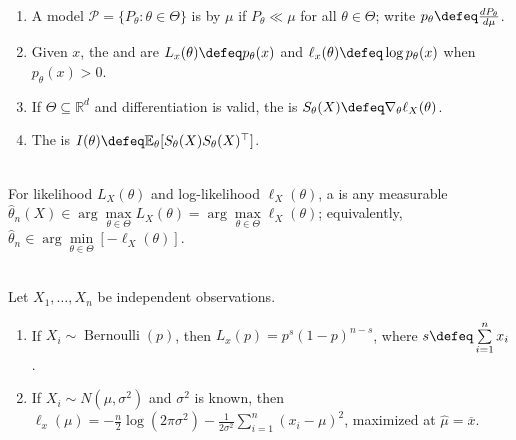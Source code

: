 \begin{definition} \label{def:dominated-model-likelihood-score-information} 
\begin{enumerate}[label=(\roman*)]
\setlength{\itemsep}{0pt}
\item A model $\mathcal{P}=\{P_\theta:\theta\in\Theta\}$ is  by $\mu$ if $P_\theta\ll\mu$ for all $\theta\in\Theta$; write $p_\theta\defeq \frac{dP_\theta}{d\mu}$.
\item Given $x$, the  and  are $L_x(\theta)\defeq p_\theta(x)$ and $\ell_x(\theta)\defeq\log p_\theta(x)$ when $p_\theta(x)>0$.
\item If $\Theta\subseteq\mathbb{R}^d$ and differentiation is valid, the  is $S_\theta(X)\defeq\nabla_\theta\ell_X(\theta)$.
\item The  is $I(\theta)\defeq\mathbb{E}_\theta[S_\theta(X)S_\theta(X)^\top]$.
\end{enumerate}
\end{definition}

\begin{definition} \label{def:maximum-likelihood-estimator} \\
For likelihood $L_X(\theta)$ and log-likelihood $\ell_X(\theta)$, a  is any measurable\\
$\widehat{\theta}_n(X)\in\arg\max\limits_{\theta\in\Theta}L_X(\theta)=\arg\max\limits_{\theta\in\Theta}\ell_X(\theta)$; equivalently, $\widehat{\theta}_n\in\arg\min\limits_{\theta\in\Theta}[-\ell_X(\theta)]$.
\end{definition}

\begin{example} \label{ex:bernoulli-and-normal-likelihoods} \\
Let $X_1,\ldots,X_n$ be independent observations.
\begin{enumerate}[label=(\roman*)]
\setlength{\itemsep}{0pt}
\item If $X_i\sim\operatorname{Bernoulli}(p)$, then $L_x(p)=p^{s}(1-p)^{n-s}$, where $s\defeq\sum\limits_{i=1}^{n}x_i$.
\item If $X_i\sim N(\mu,\sigma^2)$ and $\sigma^2$ is known, then $\ell_x(\mu)=-\frac{n}{2}\log(2\pi\sigma^2)-\frac{1}{2\sigma^2}\sum\limits_{i=1}^{n}(x_i-\mu)^2$, maximized at $\widehat{\mu}=\overline{x}$.
\end{enumerate}
\end{example}


